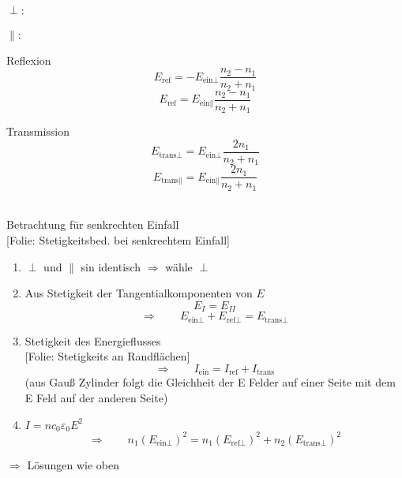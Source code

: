 \documentclass[titlepage,11pt,a4paper,ngerman]{report}
\newcommand{\tx}[1]{\textrm{#1}}
\newcommand{\folie}[1]{\color{gray}[Folie: #1]\color{black}}
\renewcommand{\epsilon}{\varepsilon}
\begin{document}
\begin{minipage}{.05\linewidth}
	$ \perp : $ \\\\[5pt] $ \parallel : $
\end{minipage}%
\begin{minipage}{.45\linewidth}
	\centering
	Reflexion
	\begin{equation*}
	E_{\tx{ref}} = - E_{\tx{ein} \perp} \frac{n_2 - n_1}{n_2 + n_1}
	\end{equation*}
	\begin{equation*}
	E_{\tx{ref}} = E_{\tx{ein} \parallel} \frac{n_2 - n_1}{n_2 + n_1} 
	\end{equation*}
	\vspace{10pt}
\end{minipage}\nolinebreak%
\begin{minipage}{.45\linewidth}
	\centering
	Transmission
	\begin{equation*}
	E_{\tx{trans} \perp} = E_{\tx{ein} \perp} \frac{2 n_1}{n_2 + n_1}
	\end{equation*}
	\begin{equation*}
	E_{\tx{trans} \parallel} = E_{\tx{ein} \parallel} \frac{2 n_1}{n_2 + n_1}
	\end{equation*}
	\vspace{10pt}
\end{minipage}%
\\
Betrachtung für senkrechten Einfall\\
\folie{Stetigkeitsbed. bei senkrechtem Einfall}
\begin{enumerate}[(1)]
	\item $ \perp $ und $ \parallel $ sin identisch $ \Rightarrow $ wähle $ \perp $
	\item Aus Stetigkeit der Tangentialkomponenten von $ E $
	\begin{equation*}
	E_{I} = E_{II}
	\end{equation*}
	\begin{equation*}
	\Rightarrow \qquad E_{\tx{ein} \perp} + E_{\tx{ref} \perp} = E_{\tx{trans} \perp}
	\end{equation*}
	\item Stetigkeit des Energieflusses\\
	\folie{Stetigkeits an Randflächen}
	\begin{equation*}
	\Rightarrow \qquad I_{\tx{ein}} = I_{\tx{ref}} + I_{\tx{trans}}
	\end{equation*}
	(aus Gauß Zylinder folgt die Gleichheit der E Felder auf einer Seite mit dem E Feld auf der anderen Seite)
	\item $ I = n c_0 \epsilon_0 E^2 $
	\begin{equation*}
	\Rightarrow \qquad n_1 (E_{\tx{ein} \perp})^2 = n_1 (E_{\tx{ref} \perp})^2 + n_2 (E_{\tx{trans} \perp})^2
	\end{equation*}
\end{enumerate}
$ \Rightarrow $ Lösungen wie oben
\end{document}
